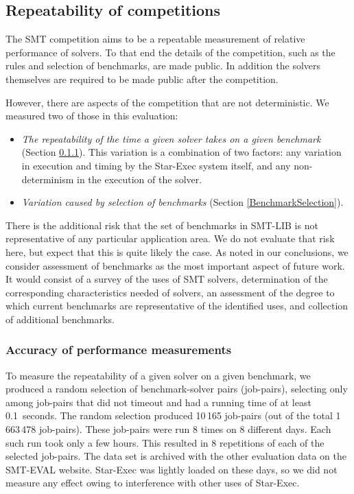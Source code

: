 \documentclass[smallcondensed]{svjour3}
\begin{document}
\subsection{Repeatability of competitions}
\label{CompetitionRepeatability}

The SMT competition aims to be a repeatable measurement of relative performance of solvers. To that end the details of the competition, such as the rules and selection of benchmarks, are made public. In addition the solvers themselves are required to be made public after the competition.

However, there are aspects of the competition that are not deterministic. We measured two of those in this evaluation:
\begin{itemize}[noitemsep,nolistsep]
\item {\em The repeatability of the time a given solver takes on a given benchmark} (Section \ref{Accuracy}). This variation is a combination of two factors: any variation in execution and timing by the Star-Exec system itself, and any non-determinism in the execution of the solver.
\item {\em Variation caused by selection of benchmarks} (Section \ref{BenchmarkSelection}). \end{itemize}
 
 There is the additional risk that the set of benchmarks in SMT-LIB is not representative of any particular application area. 
We do not evaluate that risk here, but expect that this is quite likely the case.
As noted in our conclusions, we consider assessment of benchmarks as the most 
important aspect of future work. It would consist of a survey of the uses of SMT solvers, determination of the corresponding characteristics needed of solvers, an assessment of the degree to which current benchmarks are representative of the identified uses, and collection of additional benchmarks.

 
\subsubsection{Accuracy of performance measurements}
\label{Accuracy}

To measure the repeatability of a given solver on a given benchmark, we produced a random selection of benchmark-solver pairs (job-pairs), selecting only among job-pairs that did not timeout and had a running time of at least 0.1~seconds. The random selection produced 10\,165 job-pairs (out of the total 1\,663\,478 job-pairs). These job-pairs were run 8 times on 8 different days. Each such run took only a few hours. This resulted in 8 repetitions of each of the selected job-pairs. The data set is archived with the other evaluation data on the SMT-EVAL website. Star-Exec was lightly loaded on these days, so we did not measure any effect owing to interference with other uses of Star-Exec.
\end{document}
